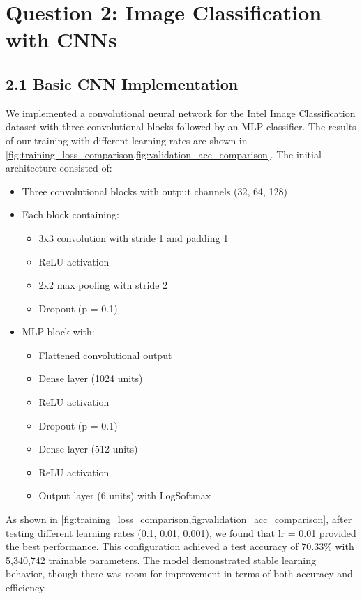 \section{Question 2: Image Classification with CNNs}

\subsection{2.1 Basic CNN Implementation}

We implemented a convolutional neural network for the Intel Image Classification dataset with three convolutional blocks followed by an MLP classifier. The results of our training with different learning rates are shown in \cref{fig:training_loss_comparison,fig:validation_acc_comparison}. The initial architecture consisted of:

\begin{itemize}
    \item Three convolutional blocks with output channels (32, 64, 128)
    \item Each block containing:
        \begin{itemize}
            \item 3x3 convolution with stride 1 and padding 1
            \item ReLU activation
            \item 2x2 max pooling with stride 2
            \item Dropout (p = 0.1)
        \end{itemize}
    \item MLP block with:
        \begin{itemize}
            \item Flattened convolutional output
            \item Dense layer (1024 units)
            \item ReLU activation
            \item Dropout (p = 0.1)
            \item Dense layer (512 units)
            \item ReLU activation
            \item Output layer (6 units) with LogSoftmax
        \end{itemize}
\end{itemize}

As shown in \cref{fig:training_loss_comparison,fig:validation_acc_comparison}, after testing different learning rates (0.1, 0.01, 0.001), we found that lr = 0.01 provided the best performance. This configuration achieved a test accuracy of 70.33\% with 5,340,742 trainable parameters. The model demonstrated stable learning behavior, though there was room for improvement in terms of both accuracy and efficiency.

